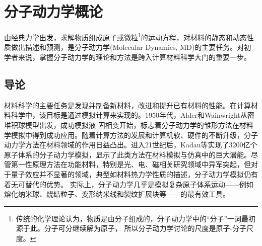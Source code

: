 \chapter{分子动力学概论}\label{chapter:MD}
由经典力学出发，求解物质组成原子或微粒\footnote{传统的化学理论认为，物质是由分子组成的，分子动力学中的``分子''一词最初源于此。分子可分继续解为原子，%
所以分子动力学讨论的尺度是原子-分子尺度。%
}的运动方程，对材料的静态和动态性质做出描述和预测，是分子动力学\textrm{(Molecular Dynamics, MD)}的主要任务。对初学者来说，掌握分子动力学的理论和方法是跨入计算材料科学大门的重要一步。

\section{导论}
材料科学的主要任务是发现并制备新材料，改进和提升已有材料的性能。在计算材料科学中，该目标是通过模拟计算来实现的。1950年代，\textrm{Alder}和\textrm{Wainwright}从密堆积球模型出发，成功模拟液-固相变\cite{JCP27-1208_1957}开始，标志着分子动力学的雏形方法在材料学模拟中得到成功应用。随着计算方法的发展和计算机软、硬件的不断升级，分子动力学方法在材料领域的作用日益凸出。进入21世纪后，\textrm{Kadau}等实现了3200亿个原子体系的分子动力学模拟\cite{IJMPC17-1755_2006}，显示了此类方法在材料模拟与仿真中的巨大潜能。尽管第一性原理方法在功能材料，特别是光、电、磁相关研究领域中异军突起，但对于量子效应并不显著的领域，典型如材料热力学性质的描述，分子动力学模拟仍有着无可替代的优势。%
实际上，分子动力学几乎是模拟复杂原子体系运动——例如熔化纳米球、烧结粒子、变形纳米线和裂纹扩展块等——的最有效工具。%

